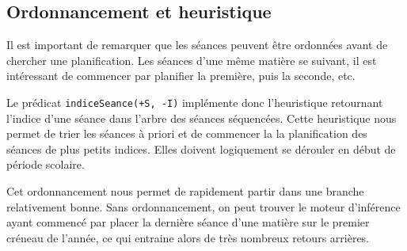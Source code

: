 
\subsection{Ordonnancement et heuristique}

Il est important de remarquer que les séances peuvent être ordonnées avant de
chercher une planification. Les séances d'une même matière se suivant, il est
intéressant de commencer par planifier la première, puis la seconde, etc.

Le prédicat \texttt{indiceSeance(+S, -I)} implémente donc l'heuristique
retournant l'indice d'une séance dans l'arbre des séances séquencées. Cette
heuristique nous permet de trier les séances à priori et de commencer la
la planification des séances de plus petits indices. Elles doivent logiquement
se dérouler en début de période scolaire.

Cet ordonnancement nous permet de rapidement partir dans une branche
relativement bonne. Sans ordonnancement, on peut trouver le moteur d'inférence
ayant commencé par placer la dernière séance d'une matière sur le premier
créneau de l'année, ce qui entraine alors de très nombreux retours arrières.

